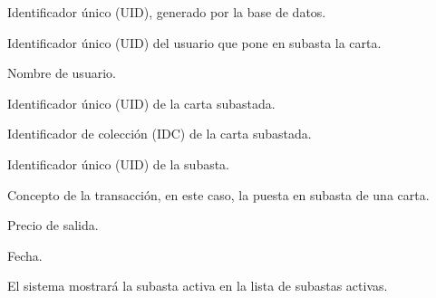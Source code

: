 \begin{RFSubastas}
\begin{RFSubastas}
		\begin{RFSubastas}
			\item Identificador único (UID), generado por la base de datos.
			\item Identificador único (UID) del usuario que pone en subasta la carta.
			\item Nombre de usuario.
			\item Identificador único (UID) de la carta subastada.
			\item Identificador de colección (IDC) de la carta subastada.
			\item Identificador único (UID) de la subasta.
			\item Concepto de la transacción, en este caso, la puesta en subasta de una carta.
			\item Precio de salida.
			\item Fecha.
		\end{RFSubastas}
		\item El sistema mostrará la subasta activa en la lista de subastas activas.
	\end{RFSubastas}


\end{RFSubastas}

